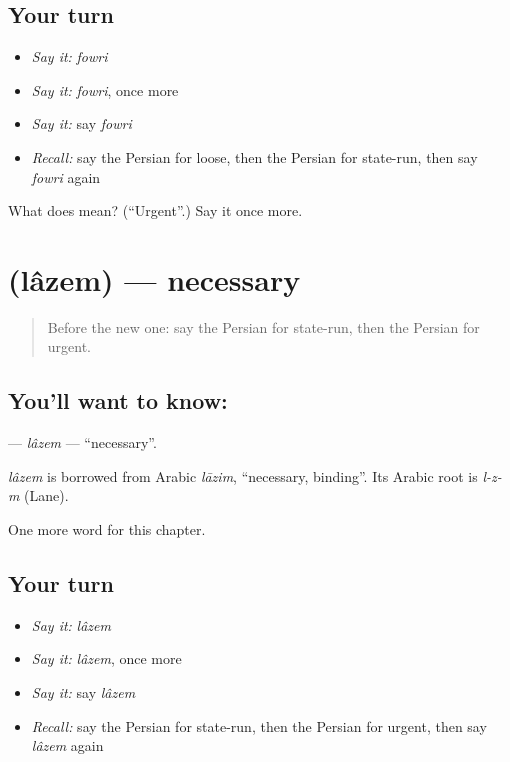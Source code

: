 \subsection*{Your turn}
\begin{itemize}
\raggedright
  \item \emph{Say it:} \emph{fowri}
  \item \emph{Say it:} \emph{fowri}, once more
  \item \emph{Say it:} say \emph{fowri}
  \item \emph{Recall:} say the Persian for loose, then the Persian for state-run, then say \emph{fowri} again
\end{itemize}

\begin{tcolorbox}[breakable,colback=teal!4,colframe=teal!35!black,title={Before you move on}]
What does  mean? (\textquotedblleft{}Urgent\textquotedblright{}.) Say it once more.
\end{tcolorbox}
\section[\texorpdfstring{\fa{لازم} (lâzem)}{لازم (lâzem)}]{ (lâzem) — necessary}

\label{lesson:FA-C162-lazem}



\begin{quote}
Before the new one: say the Persian for state-run, then the Persian for urgent.
\end{quote}

\subsection*{You'll want to know: }
\textbf{} — \emph{lâzem} — \textquotedblleft{}necessary\textquotedblright{}.

\begin{cousinweb}
\emph{lâzem} is borrowed from Arabic \emph{lāzim}, \textquotedblleft{}necessary, binding\textquotedblright{}. Its Arabic root is \emph{l-z-m} (Lane).
\end{cousinweb}

\begin{grammarlens}[title={What you've built}]
One more word for this chapter.
\end{grammarlens}

\subsection*{Your turn}
\begin{itemize}
\raggedright
  \item \emph{Say it:} \emph{lâzem}
  \item \emph{Say it:} \emph{lâzem}, once more
  \item \emph{Say it:} say \emph{lâzem}
  \item \emph{Recall:} say the Persian for state-run, then the Persian for urgent, then say \emph{lâzem} again
\end{itemize}

